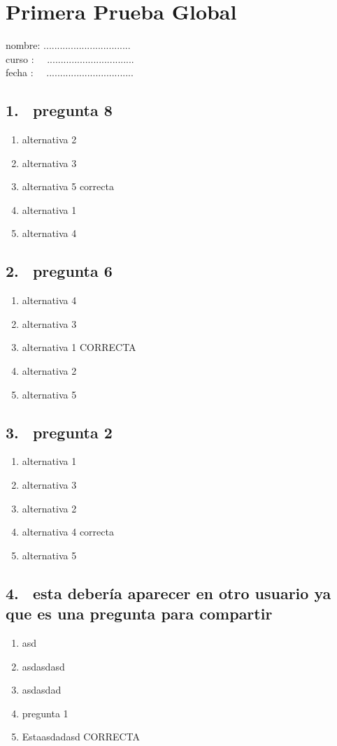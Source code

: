 \documentclass[8pt]{article}
\begin{document}
 \section{Primera Prueba Global}
 nombre:   ................................\\
curso :     \ \ ................................\\
fecha :   \ \ ................................\\
\subsection*{1. \  pregunta 8}
\begin{enumerate}[label=(\alph*)]
\item alternativa 2
\item alternativa 3
\item alternativa 5 correcta
\item alternativa 1
\item alternativa 4
\end{enumerate}

\subsection*{2. \  pregunta 6}
\begin{enumerate}[label=(\alph*)]
\item alternativa 4
\item alternativa 3
\item alternativa 1 CORRECTA
\item alternativa 2
\item alternativa 5
\end{enumerate}
\subsection*{3. \  pregunta 2}
\begin{enumerate}[label=(\alph*)]
\item alternativa 1
\item alternativa 3
\item alternativa 2 
\item alternativa 4 correcta
\item alternativa 5
\end{enumerate}
\subsection*{4. \  esta debería aparecer en otro usuario ya que es una pregunta para compartir}
\begin{enumerate}[label=(\alph*)]
\item asd
\item asdasdasd
\item asdasdad
\item pregunta 1
\item Estaasdadasd CORRECTA
\end{enumerate}
\newpage
\end{document}
